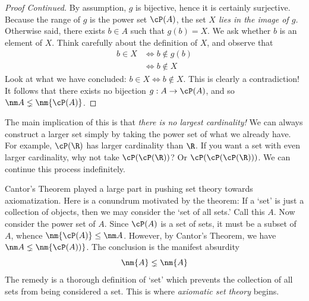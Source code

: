 \begin{proof}[Proof Continued]  
By assumption, $g$ is bijective, hence it is certainly surjective. Because the range of $g$ is the power set $\cP(A)$, the set \emph{$X$ lies in the image of $g$.} Otherwise said, there exists $b\in A$ such that $g(b)=X$. We ask whether $b$ is an element of $X$. Think carefully about the definition of $X$, and observe that
\begin{align*}
b\in X&\iff b\not\in g(b)\tag*{(by the definition of $X$)}\\
&\iff b\not\in X\tag*{(since $X=g(b)$)}
\end{align*}
Look at what we have concluded: $b\in X\iff b\not\in X$. This is clearly a contradiction!\\[2pt]
It follows that there exists no bijection $g:A\to\cP(A)$, and so $\nm A\lneq\nm{\cP(A)}$.
\end{proof}

\noindent The main implication of this is that \emph{there is no largest cardinality!} We can always construct a larger set simply by taking the power set of what we already have. For example, $\cP(\R)$ has larger cardinality than $\R$. If you want a set with even larger cardinality, why not take $\cP(\cP(\R))$? Or $\cP(\cP(\cP(\R)))$. We can continue this process indefinitely.

Cantor's Theorem played a large part in pushing set theory towards axiomatization. Here is a conundrum motivated by the theorem: If a `set' is just a collection of objects, then we may consider the `set of all sets.' Call this $A$. Now consider the power set of $A$. Since $\cP(A)$ is a set of sets, it must be a subset of $A$, whence $\nm{\cP(A)}\le\nm A$. However, by Cantor's Theorem, we have $\nm A\lneq\nm{\cP(A))}$. The conclusion is the manifest absurdity
\[\nm{A}\lneq\nm{A}\]
The remedy is a thorough definition of `set' which prevents the collection of all sets from being considered a set. This is where \emph{axiomatic set theory} begins. 


